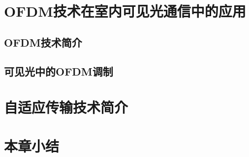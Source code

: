 \section{OFDM技术在室内可见光通信中的应用}
\subsection{OFDM技术简介}
\subsection{可见光中的OFDM调制}
\section{自适应传输技术简介}
\section{本章小结}
